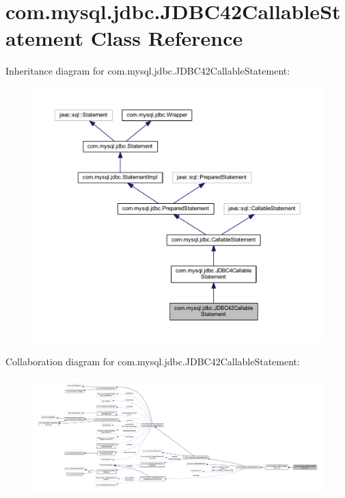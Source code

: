 \hypertarget{classcom_1_1mysql_1_1jdbc_1_1_j_d_b_c42_callable_statement}{}\section{com.\+mysql.\+jdbc.\+J\+D\+B\+C42\+Callable\+Statement Class Reference}
\label{classcom_1_1mysql_1_1jdbc_1_1_j_d_b_c42_callable_statement}


Inheritance diagram for com.\+mysql.\+jdbc.\+J\+D\+B\+C42\+Callable\+Statement\+:
\nopagebreak
\begin{figure}[H]
\begin{center}
\leavevmode
\includegraphics[width=350pt]{classcom_1_1mysql_1_1jdbc_1_1_j_d_b_c42_callable_statement__inherit__graph}
\end{center}
\end{figure}


Collaboration diagram for com.\+mysql.\+jdbc.\+J\+D\+B\+C42\+Callable\+Statement\+:
\nopagebreak
\begin{figure}[H]
\begin{center}
\leavevmode
\includegraphics[width=350pt]{classcom_1_1mysql_1_1jdbc_1_1_j_d_b_c42_callable_statement__coll__graph}
\end{center}
\end{figure}
